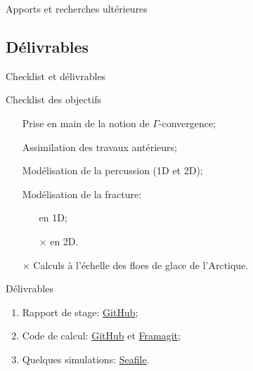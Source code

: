 \begin{frame}{Apports et recherches ultérieures}
{	}
    
\end{frame}




\subsection{Délivrables}

\begin{frame}{Checklist et délivrables}

        \begin{block}{Checklist des objectifs}
    	\begin{enumerate}
      	\item[\checkmark] Prise en main de la notion de $\Gamma$‑convergence;
      	\item[\checkmark] Assimilation des travaux antérieurs;
      	\item[\checkmark] Modélisation de la percussion (1D et 2D);
      	\item[\checkmark] Modélisation de la fracture:
      	\begin{itemize}
        \item[\checkmark] en 1D;
        \item[$\times$] en 2D.
        \end{itemize}
      	\item[$\times$] Calculs à l'échelle des floes de glace de l'Arctique.
      	\end{enumerate}
		\end{block}
	
        \begin{exampleblock}{Délivrables}
        \begin{enumerate}
        \item Rapport de stage: \myemoji \textcolor{orange}{\href{https://github.com/desmond-rn/ice-floes/tree/master/pdf}{ GitHub}};
        \item Code de calcul: \myemoji \textcolor{orange}{\href{https://github.com/desmond-rn/ice-floes/tree/master/code}{ GitHub}} et \myemoji \textcolor{orange}{\href{https://framagit.org/RaK/SimuRessorts}{ Framagit}};
        \item Quelques simulations: \myemoji \textcolor{orange}{\href{https://seafile.unistra.fr/d/a6c3680909624b22be7c/}{ Seafile}}.
        \end{enumerate}
		\end{exampleblock}
    
\end{frame}
